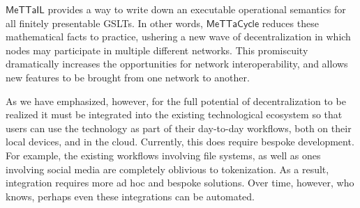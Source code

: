 \documentclass{article}
\newcommand{\MC}{\mathsf{MeTTaCycle}}
\begin{document}
$\mathsf{MeTTaIL}$ provides a way to write down an executable
operational semantics for all finitely presentable GSLTs. In other
words, $\MC$ reduces these mathematical facts to practice, ushering a
new wave of decentralization in which nodes may participate in
multiple different networks. This promiscuity dramatically increases
the opportunities for network interoperability, and allows new
features to be brought from one network to another.

As we have emphasized, however, for the full potential of
decentralization to be realized it must be integrated into the
existing technological ecosystem so that users can use the technology
as part of their day-to-day workflows, both on their local devices, and in
the cloud. Currently, this does require bespoke development. For
example, the existing workflows involving file systems, as well as
ones involving social media are completely oblivious to
tokenization. As a result, integration requires more ad hoc and
bespoke solutions. Over time, however, who knows, perhaps even these
integrations can be automated.
\end{document}

